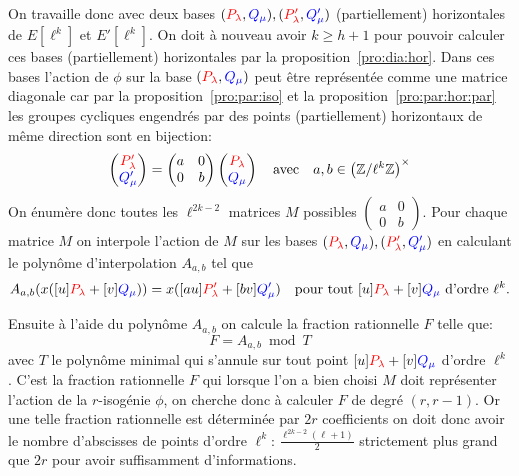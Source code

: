 \documentclass[10pt,a4paper]{book}
\theoremstyle{plain}
\theoremstyle{definition}
\theoremstyle{definition}
\theoremstyle{definition}
\theoremstyle{definition}
\theoremstyle{remark}
\theoremstyle{remark}
\theoremstyle{definition}
\begin{document}
 On travaille donc avec deux bases $(\color{red}P_{\lambda} \color{black},
 \color{blue}Q_{\mu}\color{black}),(\color{red}P'_{\lambda}\color{black},
 \color{blue}Q'_{\mu}\color{black})$ (partiellement) horizontales de 
 $E[\ell^k]$ et $E'[\ell^k]$.
 On doit à nouveau avoir $k \geqslant h +1$ pour pouvoir calculer ces bases 
(partiellement) horizontales par la proposition~\ref{pro:dia:hor}.
 Dans ces bases l'action de $\phi$ sur la base 
 $(\color{red}P_{\lambda} \color{black},\color{blue}Q_{\mu}\color{black})$ 
 peut être représentée comme une matrice diagonale car par la 
 proposition~\ref{pro:par:iso} et la proposition~\ref{pro:par:hor:par} les 
 groupes cycliques engendrés par des points (partiellement) horizontaux de
  même direction sont en bijection:
\[
\left(
\begin{matrix}
\color{red} P'_{\lambda} \\
\color{blue} Q'_{\mu} \color{black}
\end{matrix}
\right)= \left(\begin{matrix}
a & 0 \\
0 & b
\end{matrix} \right)
\left(
\begin{matrix}
\color{red} P_{\lambda} \\
\color{blue} Q_{\mu} \color{black}
\end{matrix}
\right)
\quad \text{avec} \quad a,b \in \left( \mathbb{Z}/\ell^k\mathbb{Z} \right)^{\times}
\]
 On énumère donc toutes les $\ell^{2k-2}$ matrices $M$ possibles $\left( 
 \begin{smallmatrix} a & 0 \\ 0 & b \end{smallmatrix} \right)$. Pour chaque 
matrice $M$ on interpole l'action de $M$ sur les bases $(\color{red}P_{\lambda}
 \color{black},\color{blue}Q_{\mu}\color{black}),(\color{red}P'_{\lambda}
\color{black},\color{blue}Q'_{\mu}\color{black})$ en calculant le 
polynôme d'interpolation $A_{a,b}$ tel que 
\[
A_{a,b}(x([u]\color{red}P_{\lambda}
 \color{black}+[v]\color{blue}Q_{\mu}\color{black}))=x([au]\color{red}P'_{\lambda}
 \color{black}+[bv]\color{blue}Q'_{\mu}\color{black}) \quad \text{pour tout $[u]\color{red}P_{\lambda}
 \color{black}+[v]\color{blue}Q_{\mu}\color{black}$ d'ordre $\ell^k$}.
\]


Ensuite à l'aide du polynôme $A_{a,b}$ on calcule la fraction rationnelle $F$ telle que:
\[
F=A_{a,b} \bmod T
\]
avec $T$ le polynôme minimal qui s'annule sur tout point $[u]\color{red}
P_{\lambda} \color{black}+[v]\color{blue}Q_{\mu}\color{black}$ d'ordre 
$\ell^k$. C'est la fraction rationnelle $F$ qui lorsque l'on a bien choisi 
$M$ doit représenter l'action de la $r$-isogénie $\phi$, on cherche donc à 
calculer $F$ de degré $(r,r-1)$. Or une telle fraction rationnelle est 
déterminée par $2r$ coefficients on doit donc avoir
le nombre d'abscisses de points d'ordre $\ell^k$: $\frac{\ell^{2k-2}(\ell+1)}
{2}$ strictement plus grand que $2r$ pour avoir suffisamment d'informations.
\end{document}
